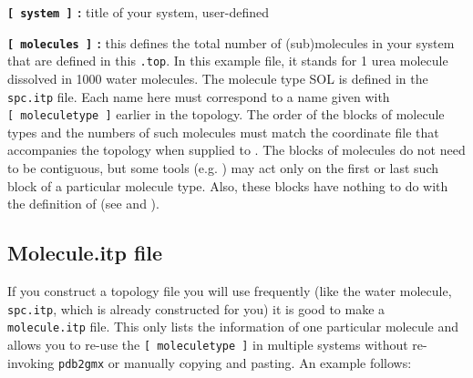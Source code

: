 {\bf {\tt [~system~]} :} title of your system, user-defined

{\bf {\tt [~molecules~]} :} this defines the total number of (sub)molecules
in your system that are defined in this {\tt *.top}. In this
example file, it stands for 1 urea molecule dissolved in 1000 water
molecules. The molecule type SOL is defined in the {\tt spc.itp} file.
Each name here must correspond to a name given with {\tt [~moleculetype~]}
earlier in the topology. The order of the blocks of molecule types and
the numbers of such molecules must match the coordinate file that
accompanies the topology when supplied to {\tt {}}.
The blocks of molecules do not need to be contiguous, but some
tools (e.g. {\tt {}}) may act only on the first or
last such block of a particular molecule type. Also, these blocks
have nothing to do with the definition of 
(see  and ).

\subsection{Molecule.itp file}
\label{subsec:molitp}
If you construct a topology file you will use frequently (like the water
molecule, {\tt spc.itp}, which is already constructed for you) it is
good to make a {\tt molecule.itp} file. This only lists the
information of one particular molecule and allows you to re-use the
{\tt [ moleculetype ]} in multiple systems without re-invoking
{\tt pdb2gmx} or manually copying and pasting. An example follows: 

